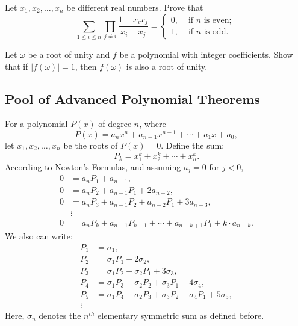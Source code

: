 \begin{question}[name={2019 IMO Shortlist}]
    Let $x_1, x_2, \dots, x_n$ be different real numbers. Prove that
    \[\sum_{1 \leqslant i \leqslant n} \prod_{j \neq i} \frac{1-x_{i} x_{j}}{x_{i}-x_{j}}=\left\{\begin{array}{ll}
    0, & \text { if } n \text { is even; } \\
    1, & \text { if } n \text { is odd. }
    \end{array}\right.\]
\end{question}


\begin{question}[name={2014 HMIC}]
    Let $\omega$ be a root of unity and $f$ be a polynomial with integer coefficients. Show that if $|f(\omega)|=1$, then $f(\omega)$ is also a root of unity.
\end{question}




\subsection{Pool of Advanced Polynomial Theorems}

\begin{tcolorbox}[title={Newton's Sums}]
    \begin{theorem}
    For a polynomial $P(x)$ of degree $n$, where
    \[P(x) = a_nx^n + a_{n-1}x^{n-1} + \cdots + a_1x + a_0,\]
    let $x_1,x_2,\ldots,x_n$ be the roots of $P(x)=0$. Define the sum:
    \[P_k = x_1^k + x_2^k + \cdots + x_n^k.\]
    According to Newton's Formulas, and assuming $a_j = 0$ for $j<0$,
    \begin{align*}
        0 &= a_nP_1 + a_{n-1},\\
        0 &= a_nP_2 + a_{n-1}P_1 + 2a_{n-2},\\
        0 &= a_nP_3 + a_{n-1}P_2 + a_{n-2}P_1 + 3a_{n-3},\\
        &\vdots\\
        0 &= a_nP_k+a_{n-1}P_{k-1}+\cdots+a_{n-k+1}P_1+k\cdot a_{n-k}.
    \end{align*}
    We also can write:
    \begin{align*}
        P_1 &= \sigma_1,\\
        P_2 &= \sigma_1P_1 - 2\sigma_2,\\
        P_3 &= \sigma_1P_2 - \sigma_2P_1 + 3\sigma_3,\\
        P_4 &= \sigma_1P_3 - \sigma_2P_2 + \sigma_3P_1 - 4\sigma_4,\\
        P_5 &= \sigma_1P_4 - \sigma_2P_3 + \sigma_3P_2 - \sigma_4P_1 + 5\sigma_5,\\
        \vdots
    \end{align*}
    Here, $\sigma_n$ denotes the $n^{th}$ elementary symmetric sum as defined before.
    \end{theorem}
\end{tcolorbox}


